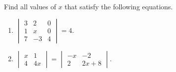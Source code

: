 \item %
Find all values of $x$ that satisfy the following equations.
\begin{enumerate}
\item \(
 \begin{vmatrix}
  3 &  2 &  0 \\
  1 &  x &  0 \\
  7 & -3 &  4
 \end{vmatrix} = 4.
\)
\item \(
 \begin{vmatrix}
  x & 1 \\
  4 & 4x
 \end{vmatrix} = \begin{vmatrix}
  -x & -2 \\
  2 & 2x + 8
 \end{vmatrix}
\).
\end{enumerate}
\EEN